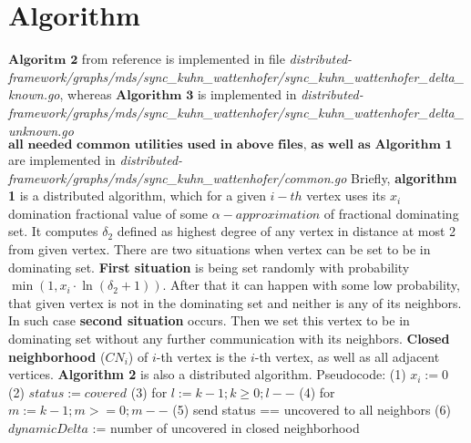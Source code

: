 \documentclass{article}
\begin{document}
\section{Algorithm}
$\textbf{Algoritm 2}$ from reference is implemented in file \newline\textit{distributed-framework/graphs/mds/sync\_kuhn\_wattenhofer/sync\_kuhn\_wattenhofer\_delta\_known.go}, \newline\newline whereas $\textbf{Algorithm 3}$ is implemented in \newline\textit{distributed-framework/graphs/mds/sync\_kuhn\_wattenhofer/sync\_kuhn\_wattenhofer\_delta\_unknown.go}
\newline\newline $\textbf{all needed common utilities used in above files, as well as Algorithm 1}$ are implemented in \newline\textit{distributed-framework/graphs/mds/sync\_kuhn\_wattenhofer/common.go}
\newline\newline Briefly, \textbf{algorithm 1} is a distributed algorithm, which for a given $i-th$ vertex uses its $x_i$ domination fractional value of some $\alpha- approximation$ of fractional dominating set. It computes $\delta_2$ defined as highest degree of any vertex in distance at most 2 from given vertex. There are two situations when vertex can be set to be in dominating set. \textbf{First situation} is being set randomly with probability $\min(1, x_i \cdot \ln{(\delta_2 + 1)})$. After that it can happen with some low probability, that given vertex is not in the dominating set and neither is any of its neighbors. In such case \textbf{second situation} occurs. Then we set this vertex to be in dominating set without any further communication with its neighbors.
\newline \textbf{Closed neighborhood} ($CN_i$) of $i$-th vertex is the $i$-th vertex, as well as all adjacent vertices. \textbf{Algorithm 2} is also a distributed algorithm. Pseudocode:
\newline(1) $x_i := 0$
\newline(2) $status := covered$
\newline(3) for $l := k - 1;  k \geq 0; l--$
\newline(4) \null\quad for $m := k - 1; m >= 0; m--$
\newline(5) \null\quad\quad send status == uncovered to all neighbors
\newline(6) \null\quad\quad  $dynamicDelta$ := number of uncovered in closed neighborhood
\end{document}
